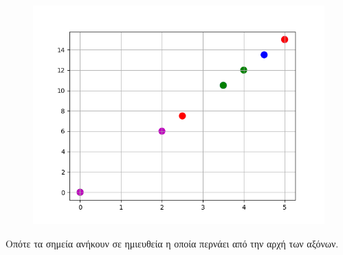 \begin{figure}
\includegraphics{3x.png}
\end{figure}
Οπότε τα σημεία ανήκουν σε ημιευθεία η οποία περνάει από την αρχή των αξόνων.


